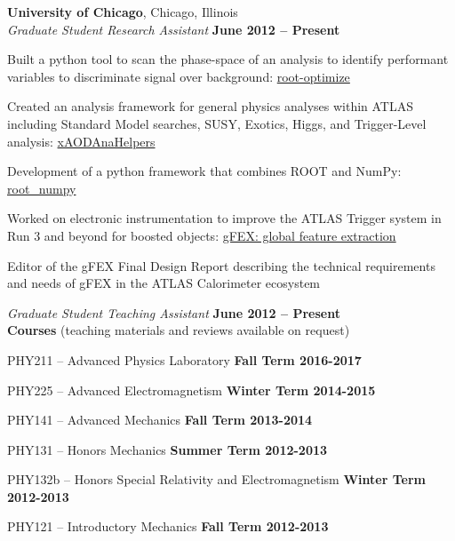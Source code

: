 \documentclass[margin,line]{resume}
\begin{document}
\begin{resume}
	\textbf{University of Chicago}, Chicago, Illinois \vspace{2mm}\\\vspace{1mm}%
	\textsl{Graduate Student Research Assistant} \hfill \textbf{June 2012 -- Present}\vspace{-3mm}\\\vspace{-1mm}%
	\begin{list2}
		\item Built a python tool to scan the phase-space of an analysis to identify performant variables to discriminate signal over background: \href{https://github.com/kratsg/Optimization}{root-optimize}
		\item Created an analysis framework for general physics analyses within ATLAS including Standard Model searches, SUSY, Exotics, Higgs, and Trigger-Level analysis: \href{https://xaodanahelpers.readthedocs.io/en/master/}{xAODAnaHelpers}
		\item Development of a python framework that combines ROOT and NumPy: \href{http://scikit-hep.org/root_numpy/}{root\_numpy}
		\item Worked on electronic instrumentation to improve the ATLAS Trigger system in Run 3 and beyond for boosted objects: \href{https://gfex.cern.ch/}{gFEX: global feature extraction}
		\item Editor of the gFEX Final Design Report describing the technical requirements and needs of gFEX in the ATLAS Calorimeter ecosystem
	\end{list2}

	\textsl{Graduate Student Teaching Assistant} \hfill \textbf{June 2012 -- Present}\\%
	\textbf{Courses} (teaching materials and reviews available on request)\vspace{-3mm}\\\vspace{-1mm}%
	\begin{list2}
		\item PHY211 -- Advanced Physics Laboratory \hfill \textbf{Fall Term 2016-2017}
		\item PHY225 -- Advanced Electromagnetism \hfill \textbf{Winter Term 2014-2015}
		\item PHY141 -- Advanced Mechanics \hfill \textbf{Fall Term 2013-2014}
		\item PHY131 -- Honors Mechanics \hfill \textbf{Summer Term 2012-2013}
		\item PHY132b -- Honors Special Relativity and Electromagnetism \hfill \textbf{Winter Term 2012-2013}
		\item PHY121 -- Introductory Mechanics \hfill \textbf{Fall Term 2012-2013}
	\end{list2}


\end{resume}
\end{document}
